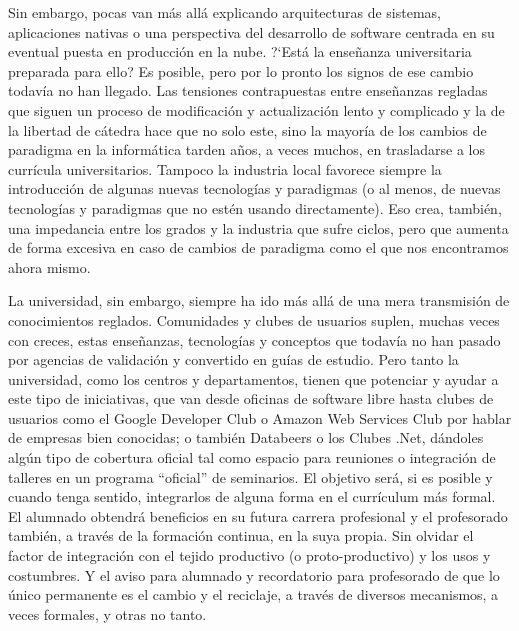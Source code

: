 \documentclass[twoside,10pt]{article}
\begin{document}
\begin{multicols}{2}
Sin embargo, pocas van m\'as all\'a explicando arquitecturas de sistemas,
aplicaciones nativas o una perspectiva del desarrollo de software centrada
en su eventual puesta en producci\'on en la nube. ?`Est\'a la ense\~nanza
universitaria preparada para ello? Es posible, pero
por lo pronto los signos de ese cambio todav\'ia no han llegado. Las
tensiones contrapuestas entre ense\~nanzas regladas que siguen un proceso
de modificaci\'on y actualizaci\'on lento y complicado y la de la libertad
de c\'atedra hace que no solo este, sino la mayor\'ia de los cambios de
paradigma en la inform\'atica tarden a\~nos, a veces muchos, en trasladarse
a los curr\'icula
universitarios. 
Tampoco la industria local favorece siempre la introducción de algunas
nuevas tecnologías y paradigmas (o al menos, de nuevas tecnologías y
paradigmas que no estén usando directamente). Eso crea, tambi\'en, una
impedancia entre los grados y
la industria que sufre ciclos, pero que aumenta de forma excesiva en
caso de cambios de paradigma como el que nos encontramos ahora mismo.
%

La universidad, sin embargo, siempre ha ido m\'as all\'a de una mera
transmisi\'on de conocimientos reglados. Comunidades y clubes de
usuarios suplen, muchas veces con creces, estas ense\~nanzas,
tecnolog\'ias y conceptos que todav\'ia no han pasado por agencias de
validaci\'on y convertido en gu\'ias de estudio. Pero tanto la
universidad, como los centros y  departamentos, tienen que
potenciar y ayudar a este tipo de iniciativas, que van desde oficinas
de software libre hasta clubes de usuarios como el Google Developer
Club o Amazon Web Services Club por hablar de empresas bien conocidas; o
tambi\'en Databeers o los Clubes .Net, 
d\'andoles alg\'un tipo de cobertura oficial tal como espacio
para reuniones o integración de talleres en un programa ``oficial'' de
seminarios. 
El objetivo será, si es posible y cuando tenga sentido, integrarlos de
alguna forma en el curr\'iculum m\'as formal. El alumnado obtendr\'a
beneficios en su
futura carrera profesional y el profesorado tambi\'en, a trav\'es de la
formaci\'on continua, en la suya propia. 
Sin olvidar el factor de integraci\'on con el tejido productivo (o
proto-productivo) y los usos y costumbres. Y el aviso para alumnado y
recordatorio para profesorado de que lo \'unico
permanente es el cambio y el reciclaje, a trav\'es de diversos mecanismos,
a veces formales, y otras no tanto.


\end{multicols}
\end{document}
